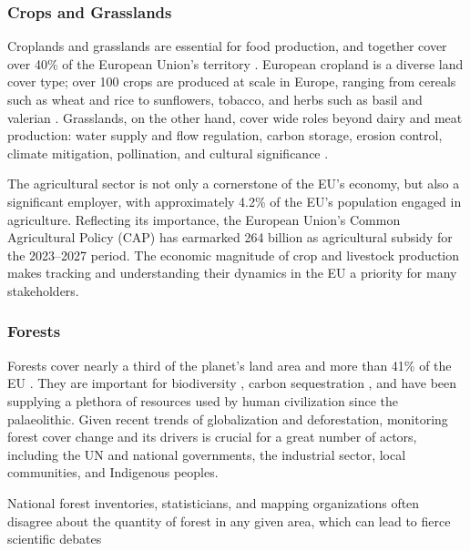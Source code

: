     \subsubsection{Crops and Grasslands}

        Croplands and grasslands are essential for food production, and together cover over 40\% of the European Union's territory \citep{eurostat2021land}. European cropland is a diverse land cover type; over 100 crops are produced at scale in Europe, ranging from cereals such as wheat and rice to sunflowers, tobacco, and herbs such as basil and valerian \citep{eurostat2023agricultural}. Grasslands, on the other hand, cover wide roles beyond dairy and meat production: water supply and flow regulation, carbon storage, erosion control, climate mitigation, pollination, and cultural significance \citep{bengtsson2019grasslands}. 
        
        The agricultural sector is not only a cornerstone of the EU's economy, but also a significant employer, with approximately 4.2\% of the EU's population engaged in agriculture. Reflecting its importance, the European Union's Common Agricultural Policy (CAP) has earmarked {\texteuro}264 billion as agricultural subsidy for the 2023--2027 period. The economic magnitude of crop and livestock production makes tracking and understanding their dynamics in the EU a priority for many stakeholders.

    \subsubsection{Forests}

        Forests cover nearly a third of the planet's land area \citep{fao2022,banskota2014forest} and more than 41\% of the EU \citep{eurostat2021land}. They are important for biodiversity \citep{cazzolla2022number}, carbon sequestration \citep{ipcc2021}, and have been supplying a plethora of resources used by human civilization since the palaeolithic. Given recent trends of globalization and deforestation, monitoring forest cover change and its drivers is crucial \citep{sy2019tropical,masolele2024mapping} for a great number of actors, including the UN and national governments, the industrial sector, local communities, and Indigenous peoples.

        National forest inventories, statisticians, and mapping organizations often disagree about the quantity of forest in any given area, which can lead to fierce scientific debates \citep{picard2021recent, korhonen2020new, palahi2021concerns, rossi2019assessing}
    

